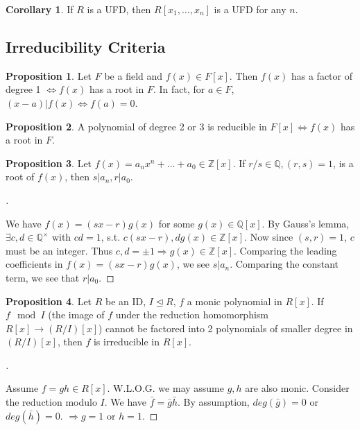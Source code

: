 \documentclass[12pt]{article}
\theoremstyle{definition}
\newtheorem{cor}{Corollary}
\newtheorem{prop}{Proposition}
\newenvironment{proofs}[1][\proofname]{%
  \begin{proof}[#1]$ $\par\nobreak\ignorespaces
}{%
  \end{proof}
}
\begin{document}
\begin{cor}
	If $R$ is a UFD, then $R[x_1, \hdots, x_n]$ is a UFD for any $n$.
\end{cor}

\subsection{Irreducibility Criteria}

\begin{prop}
	Let $F$ be a field and $f(x) \in F[x]$. Then $f(x)$ has a factor of degree 1 $\Leftrightarrow f(x)$ has a root in $F$. In fact, for $a \in F$, $(x - a)|f(x) \Leftrightarrow f(a) = 0$.
\end{prop}

\begin{prop}
	A polynomial of degree 2 or 3 is reducible in $F[x] \Leftrightarrow f(x)$ has a root in $F$.
\end{prop}

\begin{prop}
	Let $f(x) = a_n x^n + \hdots + a_0 \in \mathbb{Z}[x]$. If $r/s \in \mathbb{Q}, (r, s) = 1$, is a root of $f(x)$, then $s|a_n, r|a_0$.
\end{prop}

\begin{proofs}
	We have $f(x) = (sx-r) g(x)$ for some $g(x) \in \mathbb{Q}[x]$. By Gauss's lemma, $\exists c, d \in \mathbb{Q}^\times$ with $cd = 1$, s.t. $c(sx-r), dg(x) \in \mathbb{Z}[x]$. Now since $(s, r) = 1$, $c$ must be an integer. Thus $c, d = \pm 1 \Rightarrow g(x) \in \mathbb{Z}[x]$. Comparing the leading coefficients in $f(x) = (sx - r) g(x)$, we see $s | a_n$. Comparing the constant term, we see that $r|a_0$.
\end{proofs}

\begin{prop}
	Let $R$ be an ID, $I \trianglelefteq R$, $f$ a monic polynomial in $R[x]$. If $f \mod I$ (the image of $f$ under the reduction homomorphism $R[x] \rightarrow (R/I)[x]$) cannot be factored into 2 polynomials of smaller degree in $(R/I)[x]$, then $f$ is irreducible in $R[x]$.
\end{prop}

\begin{proofs}
	Assume $f = gh \in R[x]$. W.L.O.G. we may assume $g, h$ are also monic. Consider the reduction modulo $I$. We have $\bar{f} = \bar{g} \bar{h}$. By assumption, $deg(\bar{g}) = 0$ or $deg(\bar{h}) = 0$. $\Rightarrow g = 1$ or $h = 1$.
\end{proofs}
\end{document}
